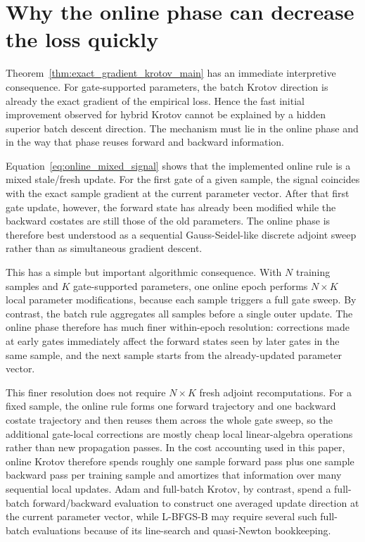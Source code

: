 \documentclass[aps,prb,10pt,twocolumn,superscriptaddress]{revtex4-2}
\begin{document}
\section{Why the online phase can decrease the loss quickly}

Theorem~\ref{thm:exact_gradient_krotov_main} has an immediate interpretive consequence. For gate-supported parameters, the batch Krotov direction is already the exact gradient of the empirical loss. Hence the fast initial improvement observed for hybrid Krotov cannot be explained by a hidden superior batch descent direction. The mechanism must lie in the online phase and in the way that phase reuses forward and backward information.

Equation~\eqref{eq:online_mixed_signal} shows that the implemented online rule is a mixed stale/fresh update. For the first gate of a given sample, the signal coincides with the exact sample gradient at the current parameter vector. After that first gate update, however, the forward state has already been modified while the backward costates are still those of the old parameters. The online phase is therefore best understood as a sequential Gauss-Seidel-like discrete adjoint sweep rather than as simultaneous gradient descent.

This has a simple but important algorithmic consequence. With \(N\) training samples and \(K\) gate-supported parameters, one online epoch performs \(N\times K\) local parameter modifications, because each sample triggers a full gate sweep. By contrast, the batch rule aggregates all samples before a single outer update. The online phase therefore has much finer within-epoch resolution: corrections made at early gates immediately affect the forward states seen by later gates in the same sample, and the next sample starts from the already-updated parameter vector.

This finer resolution does not require \(N\times K\) fresh adjoint recomputations. For a fixed sample, the online rule forms one forward trajectory and one backward costate trajectory and then reuses them across the whole gate sweep, so the additional gate-local corrections are mostly cheap local linear-algebra operations rather than new propagation passes. In the cost accounting used in this paper, online Krotov therefore spends roughly one sample forward pass plus one sample backward pass per training sample and amortizes that information over many sequential local updates. Adam and full-batch Krotov, by contrast, spend a full-batch forward/backward evaluation to construct one averaged update direction at the current parameter vector, while L-BFGS-B may require several such full-batch evaluations because of its line-search and quasi-Newton bookkeeping.
\end{document}
